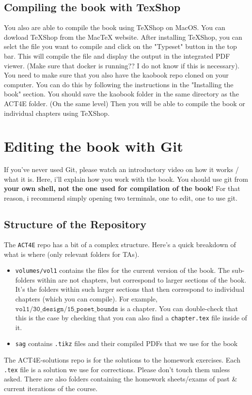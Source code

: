 \documentclass{article}
\begin{document}
\subsection{Compiling the book with TexShop}
You also are able to compile the book using TeXShop on MacOS. You can dowload TeXShop from the MacTeX website. After installing TeXShop, you can selct the file you want to compile and click on the "Typeset" button in the top bar. This will compile the file and display the output in the integrated PDF viewer. (Make sure that docker is running?? I do not know if this is necessary). You need to make sure that you also have the kaobook repo cloned on your computer. You can do this by following the instructions in the "Installing the book" section. You should save the kaobook folder in the same directory as the ACT4E folder. (On the same level) Then you will be able to compile the book or individual chapters using TeXShop.

\section{Editing the book with Git}
If you've never used Git, please watch an introductory video on how it works / what it is. Here, i'll explain how you work with the book. You should use git from \textbf{your own shell, not the one used for compilation of the book}! For that reason, i recommend simply opening two terminals, one to edit, one to use git.
\subsection{Structure of the Repository}
The \texttt{ACT4E} repo has a bit of a complex structure. Here's a quick breakdown of what is where (only relevant folders for TAs).
\begin{itemize}
    \item \texttt{volumes/vol1} contains the files for the current version of the book. The sub-folders within are not chapters, but correspond to larger sections of the book. It's the folders within such larger sections that then correspond to individual chapters (which you can compile). For example,  $\texttt{vol1/30\_design/15\_poset\_bounds}$ is a chapter. You can double-check that this is the case by checking that you can also find a \texttt{chapter.tex} file inside of it.
    \item \texttt{sag} contains \texttt{.tikz} files and their compiled PDFs that we use for the book
\end{itemize}
The ACT4E-solutions repo is for the solutions to the homework exercises. Each \texttt{.tex} file is a solution we use for corrections. Please don't touch them unless asked. There are also folders containing the homework sheets/exams of past \& current iterations of the course.
\end{document}
